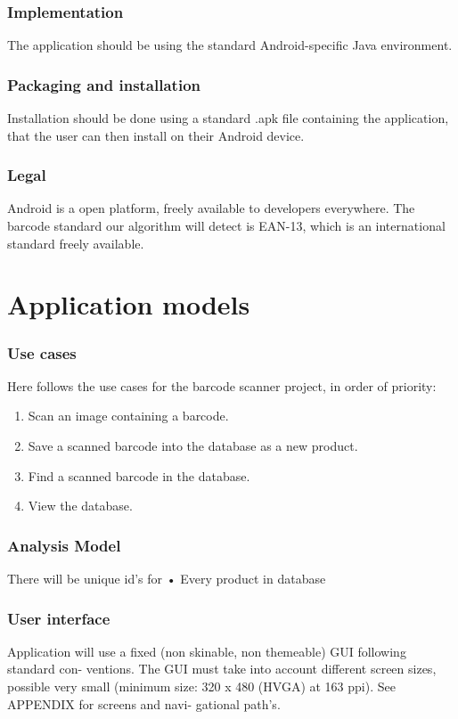 \documentclass{report}
\begin{document}
\subsection{Implementation}
The application should be using the standard Android-specific Java environment.

\subsection{Packaging and installation}
Installation should be done using a standard .apk file containing the application, that the user can then install on their Android device.

\subsection{Legal}
Android is a open platform, freely available to developers everywhere. The barcode standard our algorithm will detect is EAN-13, which is an international standard freely available.

\pagebreak

\chapter{Application models}

\subsection{Use cases}
Here follows the use cases for the barcode scanner project, in order of priority: 

\begin{enumerate}
  \item Scan an image containing a barcode.
  \item Save a scanned barcode into the database as a new product.
  \item Find a scanned barcode in the database.
  \item View the database.
\end{enumerate}

\subsection{Analysis Model}

There will be unique id's for
• Every product in database

\subsection{User interface}
Application will use a fixed (non skinable, non themeable) GUI following standard con- ventions. The GUI must take into account different screen sizes, possible very small (minimum size: 320 x 480 (HVGA) at 163 ppi). See APPENDIX for screens and navi- gational path's.





\appendix
\end{document}
